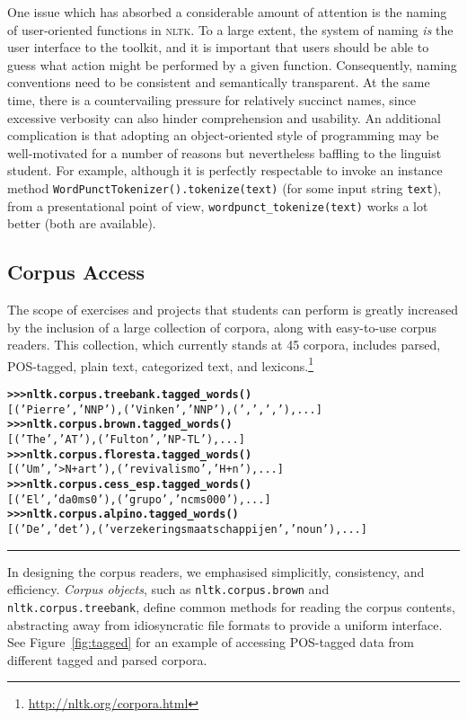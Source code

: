 \documentclass[11pt]{article}
\newcommand{\NLTK}{\textsc{nltk}}
\newcommand{\code}[1]{\texttt{\small #1}}
\begin{document}
One issue which has absorbed a considerable amount of attention is the
naming of user-oriented functions in \NLTK. To a large extent, the
system of naming \emph{is} the user interface to the toolkit, and it is
important that users should be able to guess what action might be
performed by a given function. Consequently, naming conventions need
to be consistent and semantically transparent. At the same time, there is a
countervailing pressure for relatively succinct names, since excessive verbosity
can also hinder comprehension and usability. An additional
complication is that adopting an object-oriented style of programming
may be well-motivated for a number of reasons but nevertheless
baffling to the linguist student. For example, although it is
perfectly respectable to invoke an instance method
\code{WordPunctTokenizer().tokenize(text)} (for some input
string \code{text}), from a presentational point of view, 
\code{wordpunct\_tokenize(text)} works a lot better
(both are available).


\subsection{Corpus Access}

The scope of exercises and projects that students can perform is
greatly increased by the inclusion of a large collection of corpora,
along with easy-to-use corpus readers.  This collection, which
currently stands at 45 corpora, includes parsed, POS-tagged, plain
text, categorized text, and lexicons.\footnote{\url{http://nltk.org/corpora.html}}

\begin{figure*}[t]
{\small
\begin{alltt}
\textbf{>>> nltk.corpus.treebank.tagged_words()}
[('Pierre', 'NNP'), ('Vinken', 'NNP'), (',', ','), ...]
\textbf{>>> nltk.corpus.brown.tagged_words()}
[('The', 'AT'), ('Fulton', 'NP-TL'), ...]
\textbf{>>> nltk.corpus.floresta.tagged_words()}
[('Um', '>N+art'), ('revivalismo', 'H+n'), ...]
\textbf{>>> nltk.corpus.cess_esp.tagged_words()}
[('El', 'da0ms0'), ('grupo', 'ncms000'), ...]
\textbf{>>> nltk.corpus.alpino.tagged_words()}
[('De', 'det'), ('verzekeringsmaatschappijen', 'noun'), ...]
\end{alltt}}
\caption{Accessing Different Corpora via a Uniform Interface}
\label{fig:tagged}
\vspace*{1ex}\hrule
\end{figure*}

In designing the corpus readers, we emphasised simplicitly,
consistency, and efficiency.  \emph{Corpus objects}, such as
\code{nltk.corpus.brown} and \code{nltk.corpus.treebank}, define
common methods for reading the corpus contents, abstracting
away from idiosyncratic file formats to provide a uniform interface.
See Figure~\ref{fig:tagged} for an example of accessing POS-tagged
data from different tagged and parsed corpora.
\end{document}
